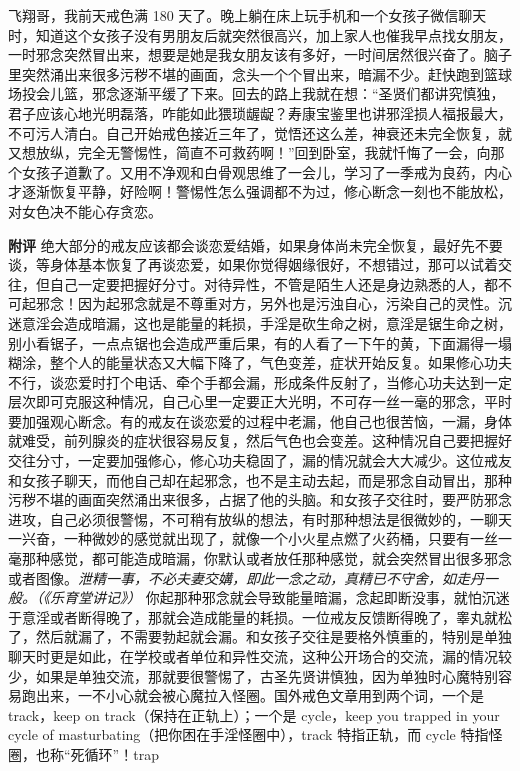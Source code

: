 \begin{case}
    飞翔哥，我前天戒色满 180 天了。晚上躺在床上玩手机和一个女孩子微信聊天时，知道这个女孩子没有男朋友后就突然很高兴，加上家人也催我早点找女朋友，一时邪念突然冒出来，想要是她是我女朋友该有多好，一时间居然很兴奋了。脑子里突然涌出来很多污秽不堪的画面，念头一个个冒出来，暗漏不少。赶快跑到篮球场投会儿篮，邪念逐渐平缓了下来。回去的路上我就在想：“圣贤们都讲究慎独，君子应该心地光明磊落，咋能如此猥琐龌龊？寿康宝鉴里也讲邪淫损人福报最大，不可污人清白。自己开始戒色接近三年了，觉悟还这么差，神衰还未完全恢复，就又想放纵，完全无警惕性，简直不可救药啊！”回到卧室，我就忏悔了一会，向那个女孩子道歉了。又用不净观和白骨观思维了一会儿，学习了一季戒为良药，内心才逐渐恢复平静，好险啊！警惕性怎么强调都不为过，修心断念一刻也不能放松，对女色决不能心存贪恋。

    \textbf{附评} 绝大部分的戒友应该都会谈恋爱结婚，如果身体尚未完全恢复，最好先不要谈，等身体基本恢复了再谈恋爱，如果你觉得姻缘很好，不想错过，那可以试着交往，但自己一定要把握好分寸。对待异性，不管是陌生人还是身边熟悉的人，都不可起邪念！因为起邪念就是不尊重对方，另外也是污浊自心，污染自己的灵性。沉迷意淫会造成暗漏，这也是能量的耗损，手淫是砍生命之树，意淫是锯生命之树，别小看锯子，一点点锯也会造成严重后果，有的人看了一下午的黄，下面漏得一塌糊涂，整个人的能量状态又大幅下降了，气色变差，症状开始反复。如果修心功夫不行，谈恋爱时打个电话、牵个手都会漏，形成条件反射了，当修心功夫达到一定层次即可克服这种情况，自己心里一定要正大光明，不可存一丝一毫的邪念，平时要加强观心断念。有的戒友在谈恋爱的过程中老漏，他自己也很苦恼，一漏，身体就难受，前列腺炎的症状很容易反复，然后气色也会变差。这种情况自己要把握好交往分寸，一定要加强修心，修心功夫稳固了，漏的情况就会大大减少。这位戒友和女孩子聊天，而他自己却在起邪念，也不是主动去起，而是邪念自动冒出，那种污秽不堪的画面突然涌出来很多，占据了他的头脑。和女孩子交往时，要严防邪念进攻，自己必须很警惕，不可稍有放纵的想法，有时那种想法是很微妙的，一聊天一兴奋，一种微妙的感觉就出现了，就像一个小火星点燃了火药桶，只要有一丝一毫那种感觉，都可能造成暗漏，你默认或者放任那种感觉，就会突然冒出很多邪念或者图像。\textit{泄精一事，不必夫妻交媾，即此一念之动，真精已不守舍，如走丹一般。（《乐育堂讲记》）} 你起那种邪念就会导致能量暗漏，念起即断没事，就怕沉迷于意淫或者断得晚了，那就会造成能量的耗损。一位戒友反馈断得晚了，睾丸就松了，然后就漏了，不需要勃起就会漏。和女孩子交往是要格外慎重的，特别是单独聊天时更是如此，在学校或者单位和异性交流，这种公开场合的交流，漏的情况较少，如果是单独交流，那就要很警惕了，古圣先贤讲慎独，因为单独时心魔特别容易跑出来，一不小心就会被心魔拉入怪圈。国外戒色文章用到两个词，一个是 track，keep on track（保持在正轨上）；一个是 cycle，keep you trapped in your cycle of masturbating（把你困在手淫怪圈中），track 特指正轨，而 cycle 特指怪圈，也称“死循环”！trap 
\end{case}
